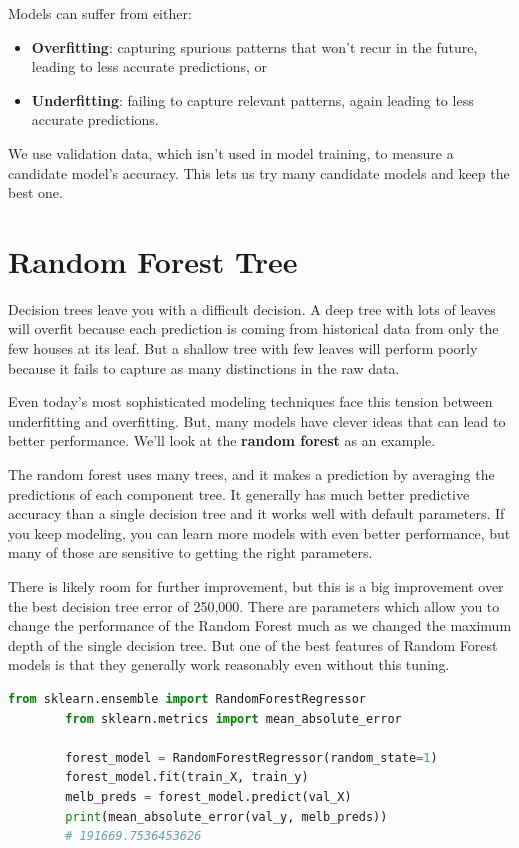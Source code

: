 \documentclass[11pt]{article}
\begin{document}
    Models can suffer from either:
    \begin{itemize}
        \item \textbf{Overfitting}: capturing spurious patterns that won't recur in the future, leading to less accurate predictions, or
        \item \textbf{Underfitting}: failing to capture relevant patterns, again leading to less accurate predictions.
    \end{itemize}
    We use validation data, which isn't used in model training, to measure a candidate model's accuracy.
    This lets us try many candidate models and keep the best one.


    \section{Random Forest Tree}\label{sec:random_forest_tree}
    Decision trees leave you with a difficult decision.
    A deep tree with lots of leaves will overfit because each prediction is coming from historical data from only the few houses at its leaf.
    But a shallow tree with few leaves will perform poorly because it fails to capture as many distinctions in the raw data.

    Even today's most sophisticated modeling techniques face this tension between underfitting and overfitting.
    But, many models have clever ideas that can lead to better performance.
    We'll look at the \textbf{random forest} as an example.

    The random forest uses many trees, and it makes a prediction by averaging the predictions of each component tree.
    It generally has much better predictive accuracy than a single decision tree and it works well with default parameters.
    If you keep modeling, you can learn more models with even better performance, but many of those are sensitive to getting the right parameters.

    There is likely room for further improvement, but this is a big improvement over the best decision tree error of 250,000.
    There are parameters which allow you to change the performance of the Random Forest much as we changed the maximum depth of the single decision tree.
    But one of the best features of Random Forest models is that they generally work reasonably even without this tuning.

    \begin{lstlisting}[style=light, language=Python,label={lst:vectorimg},caption=Random Forest Tree]
        from sklearn.ensemble import RandomForestRegressor
        from sklearn.metrics import mean_absolute_error

        forest_model = RandomForestRegressor(random_state=1)
        forest_model.fit(train_X, train_y)
        melb_preds = forest_model.predict(val_X)
        print(mean_absolute_error(val_y, melb_preds))
        # 191669.7536453626
    \end{lstlisting}
\end{document}
